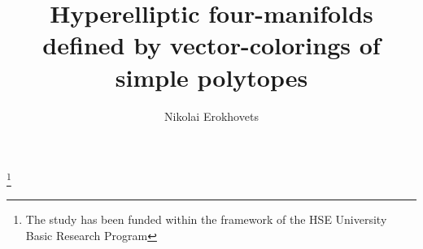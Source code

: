 \documentclass[12pt]{amsart}
\theoremstyle{definition}
\theoremstyle{remark}
\begin{document}


\title[Hyperelliptic four-manifolds defined by vector-colorings of simple polytopes]{Hyperelliptic four-manifolds defined by vector-colorings of simple polytopes}
\author[Nikolai Erokhovets]{Nikolai Erokhovets}
\address{National Research University Higher School of Economics, Moscow\& Department of Mechanics and Mathematics, Lomonosov Moscow State University}

\def\sgn{\mathrm{sgn}\,}
\def\bideg{\mathrm{bideg}\,}
\def\tdeg{\mathrm{tdeg}\,}
\def\sdeg{\mathrm{sdeg}\,}
\def\grad{\mathrm{grad}\,}
\def\ch{\mathrm{ch}\,}
\def\sh{\mathrm{sh}\,}
\def\th{\mathrm{th}\,}

\def\mod{\mathrm{mod}\,}
\def\In{\mathrm{In}\,}
\def\Im{\mathrm{Im}\,}
\def\Ker{\mathrm{Ker}\,}
\def\Hom{\mathrm{Hom}\,}
\def\Tor{\mathrm{Tor}\,}
\def\rk{\mathrm{rk}\,}
\def\codim{\mathrm{codim}\,}

\def\ko{{\mathbf k}}
\def\sk{\mathrm{sk}\,}
\def\RC{\mathrm{RC}\,}
\def\gr{\mathrm{gr}\,}

\def\R{{\mathbb R}}
\def\C{{\mathbb C}}
\def\Z{{\mathbb Z}}
\def\A{{\mathcal A}}
\def\B{{\mathcal B}}
\def\K{{\mathcal K}}
\def\M{{\mathcal M}}
\def\N{{\mathcal N}}
\def\E{{\mathcal E}}
\def\G{{\mathcal G}}
\def\D{{\mathcal D}}
\def\F{{\mathcal F}}
\def\L{{\mathcal L}}
\def\V{{\mathcal V}}
\def\H{{\mathcal H}}

\thanks{The study has been funded within the framework of the HSE University Basic Research Program}


\end{document}
